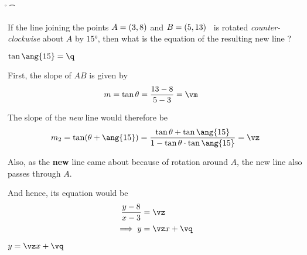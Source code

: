 



\SUBTRACT\vd\vb\ve
\SUBTRACT\vc\va\vf
\EXPR[2]\vm{\ve / \vf}

\p
\ROUND[2]\p\q

\ADD\vm\q\r
\MULTIPLY\vm\q\s
{}\s\t
\EXPR[2]\vz{\r / \t}

\MULTIPLY\vz{-\va}\vp
\EXPR[2]\vq{\vp + \vb}

\question[3] If the line joining the points $A = (3, 8)$ and $B = (5, 13)$ 
\ is rotated \textit{counter-clockwise} about $A$ by $\ang{15}$, then what is the equation 
of the resulting new line ? 

\begin{calcaid}
  $\tan\ang{15}=\q$
\end{calcaid}

\watchout

\begin{solution}[\halfpage]
    First, the slope of $AB$ is given by 
    \begin{align}
        m &= \tan\theta = \dfrac{\vd - \vb}{\vc - \va} = \vm
    \end{align}

    The slope of the \textit{new} line would therefore be 
    \[ m_2 = \tan(\theta + \ang{15}) = \dfrac{\tan\theta + \tan\ang{15}}{1-\tan\theta\cdot\tan\ang{15}} = \vz \] 
    
    Also, as the \textbf{new} line came about because of rotation around $A$, the new 
    line also passes through $A$. 
    
    And hence, its equation would be
    \begin{align}
      \dfrac{y-\vb}{x-\va} &= \vz  \\
      \implies y &= \vz x + \vq
    \end{align}
\end{solution}

\ifprintanswers
  \begin{codex}
    $y = \vz x + \vq$
  \end{codex}
\fi
